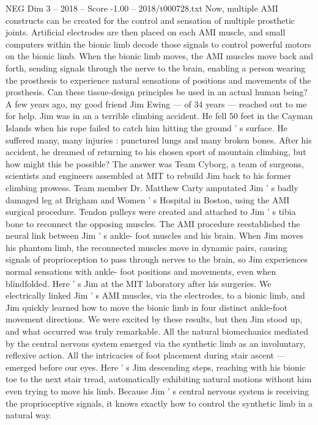 \begin{textsample}{NEG Dim 3 – 2018 – Score -1.00 – 2018/t000728.txt}
Now, multiple AMI constructs can be created for the control and sensation of multiple prosthetic joints.
Artificial electrodes are then placed on each AMI muscle, and small computers within the bionic limb decode those signals to control powerful motors on the bionic limb.
When the bionic limb moves, the AMI muscles move back and forth, sending signals through the nerve to the brain, enabling a person wearing the prosthesis to experience natural sensations of positions and movements of the prosthesis.
Can these tissue-design principles be used in an actual human being?
A few years ago, my good friend Jim Ewing — of 34 years — reached out to me for help.
Jim was in an a terrible climbing accident.
He fell 50 feet in the Cayman Islands when his rope failed to catch him hitting the ground ' s surface.
He suffered many, many injuries : punctured lungs and many broken bones.
After his accident, he dreamed of returning to his chosen sport of mountain climbing, but how might this be possible?
The answer was Team Cyborg, a team of surgeons, scientists and engineers assembled at MIT to rebuild Jim back to his former climbing prowess.
Team member Dr.
Matthew Carty amputated Jim ' s badly damaged leg at Brigham and Women ' s Hospital in Boston, using the AMI surgical procedure.
Tendon pulleys were created and attached to Jim ' s tibia bone to reconnect the opposing muscles.
The AMI procedure reestablished the neural link between Jim ' s ankle- foot muscles and his brain.
When Jim moves his phantom limb, the reconnected muscles move in dynamic pairs, causing signals of proprioception to pass through nerves to the brain, so Jim experiences normal sensations with ankle- foot positions and movements, even when blindfolded.
Here ' s Jim at the MIT laboratory after his surgeries.
We electrically linked Jim ' s AMI muscles, via the electrodes, to a bionic limb, and Jim quickly learned how to move the bionic limb in four distinct ankle-foot movement directions.
We were excited by these results, but then Jim stood up, and what occurred was truly remarkable.
All the natural biomechanics mediated by the central nervous system emerged via the synthetic limb as an involuntary, reflexive action.
All the intricacies of foot placement during stair ascent — emerged before our eyes.
Here ' s Jim descending steps, reaching with his bionic toe to the next stair tread, automatically exhibiting natural motions without him even trying to move his limb.
Because Jim ' s central nervous system is receiving the proprioceptive signals, it knows exactly how to control the synthetic limb in a natural way.

\end{textsample}
